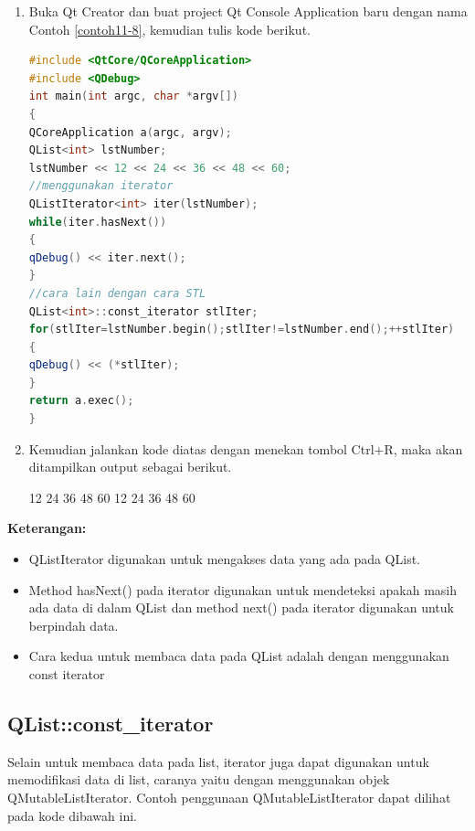 \begin{enumerate}

\item
  Buka Qt Creator dan buat project Qt Console Application baru dengan
  nama Contoh \ref{contoh11-8}, kemudian tulis kode berikut.

\begin{lstlisting}[language=c++, caption=Menggunakan object Iterator, label=contoh11-8]
#include <QtCore/QCoreApplication>
#include <QDebug>
int main(int argc, char *argv[])
{
QCoreApplication a(argc, argv);
QList<int> lstNumber;
lstNumber << 12 << 24 << 36 << 48 << 60;
//menggunakan iterator
QListIterator<int> iter(lstNumber);
while(iter.hasNext())
{
qDebug() << iter.next();
}
//cara lain dengan cara STL
QList<int>::const_iterator stlIter;
for(stlIter=lstNumber.begin();stlIter!=lstNumber.end();++stlIter)
{
qDebug() << (*stlIter);
}
return a.exec();
}
\end{lstlisting}
\item
  Kemudian jalankan kode diatas dengan menekan tombol Ctrl+R, maka akan
  ditampilkan output sebagai berikut.

\begin{lcverbatim}
12
24
36
48
60
12
24
36
48
60
\end{lcverbatim}
\end{enumerate}

\textbf{Keterangan:}

\begin{itemize}

\item
  QListIterator digunakan untuk mengakses data yang ada pada QList.
\item
  Method hasNext() pada iterator digunakan untuk mendeteksi apakah masih
  ada data di dalam QList dan method next() pada iterator digunakan
  untuk berpindah data.
\item
  Cara kedua untuk membaca data pada QList adalah dengan menggunakan
  const iterator
\end{itemize}

\subsection{QList::const\_iterator}

Selain untuk membaca data pada list, iterator juga dapat digunakan untuk
memodifikasi data di list, caranya yaitu dengan menggunakan objek
QMutableListIterator. Contoh penggunaan QMutableListIterator dapat
dilihat pada kode dibawah ini.

